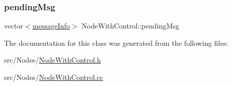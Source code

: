 \mbox{\label{class_node_with_control_af38ffbedc82038536c77314f22ea6b57}} 
\subsubsection{\texorpdfstring{pending\+Msg}{pendingMsg}}
{\footnotesize\ttfamily vector$<$\hyperlink{structures_8h_a7e7bdc1d2fff8a9436f2f352b2711ed6}{message\+Info}$>$ Node\+With\+Control\+::pending\+Msg\hspace{0.3cm}{\ttfamily [protected]}}



The documentation for this class was generated from the following files\+:\begin{DoxyCompactItemize}
\item 
src/\+Nodes/\hyperlink{_node_with_control_8h}{Node\+With\+Control.\+h}\item 
src/\+Nodes/\hyperlink{_node_with_control_8cc}{Node\+With\+Control.\+cc}\end{DoxyCompactItemize}
